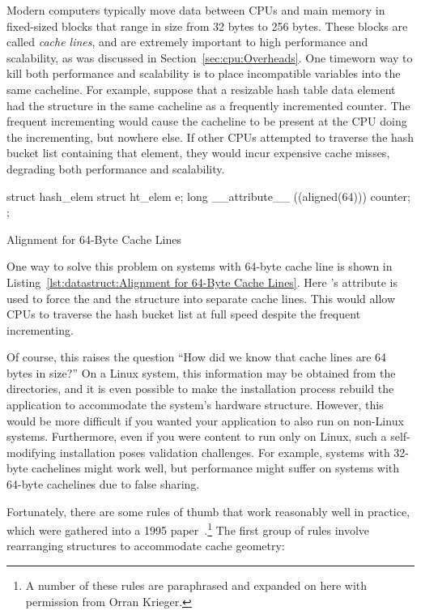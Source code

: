 Modern computers typically move data between CPUs and main memory in
fixed-sized blocks that range in size from 32 bytes to 256 bytes.
These blocks are called \emph{cache lines}, and are extremely important
to high performance and scalability, as was discussed in
Section~\ref{sec:cpu:Overheads}.
One timeworn way to kill both performance and scalability is to
place incompatible variables into the same cacheline.
For example, suppose that a resizable hash table data element had
the  structure in the same cacheline as a frequently incremented
counter.
The frequent incrementing would cause the cacheline to be present at
the CPU doing the incrementing, but nowhere else.
If other CPUs attempted to traverse the hash bucket list containing
that element, they would incur expensive cache misses, degrading both
performance and scalability.

\begin{listing}[tb]
\begin{VerbatimL}
struct hash_elem {
	struct ht_elem e;
	long __attribute__ ((aligned(64))) counter;
};
\end{VerbatimL}
\caption{Alignment for 64-Byte Cache Lines}
\label{lst:datastruct:Alignment for 64-Byte Cache Lines}
\end{listing}

One way to solve this problem on systems with 64-byte cache line is shown in
Listing~\ref{lst:datastruct:Alignment for 64-Byte Cache Lines}.
Here \GCC's  attribute is used to force the 
and the  structure into separate cache lines.
This would allow CPUs to traverse the hash bucket list at full speed
despite the frequent incrementing.

Of course, this raises the question ``How did we know that cache lines
are 64 bytes in size?''
On a Linux system, this information may be obtained from the
 directories, and it is even
possible to make the installation process rebuild the application to
accommodate the system's hardware structure.
However, this would be more difficult if you wanted your application to
also run on non-Linux systems.
Furthermore, even if you were content to run only on Linux, such a
self-modifying installation poses validation challenges.
For example, systems with 32-byte cachelines might work well, but
performance might suffer on systems with 64-byte cachelines due
to false sharing.

Fortunately, there are some rules of thumb that work reasonably well in
practice, which were gathered into a 1995
paper~\cite{BenjaminGamsa95a}.\footnote{
	A number of these rules are paraphrased and expanded on here
	with permission from Orran Krieger.}
The first group of rules involve rearranging structures to accommodate
cache geometry:

